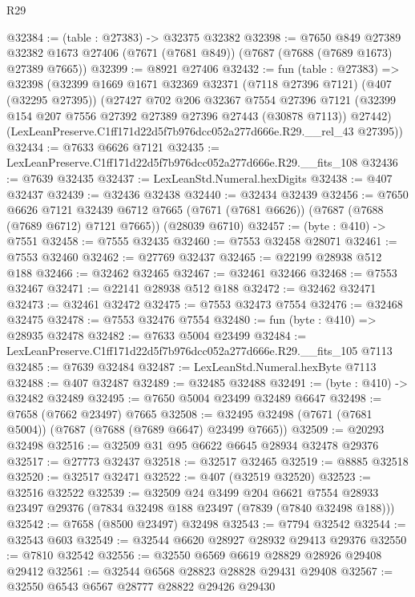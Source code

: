 \begin{lexlean}{R29}
\begin{coremodule}
@32384 := (table : @27383) -> @32375 @32382
@32398 := @7650
    @849
    @27389
    @32382
    @1673
    @27406
    (@7671 (@7681 @849))
    (@7687 (@7688 (@7689 @1673) @27389 @7665))
@32399 := @8921 @27406
@32432 := fun (table : @27383) =>
  @32398
    (@32399
      @1669
      @1671
      @32369
      @32371
      (@7118 @27396 @7121)
      (@407 (@32295 @27395))
      (@27427
        @702
        @206
        @32367
        @7554
        @27396
        @7121
        (@32399 @154 @207 @7556 @27392 @27389 @27396 @27443 (@30878 @7113))
        @27442)
      (LexLeanPreserve.C1ff171d22d5f7b976dcc052a277d666e.R29.__rel_43 @27395))
@32434 := @7633 @6626 @7121
@32435 := LexLeanPreserve.C1ff171d22d5f7b976dcc052a277d666e.R29.__fits_108
@32436 := @7639 @32435
@32437 := LexLeanStd.Numeral.hexDigits
@32438 := @407 @32437
@32439 := @32436 @32438
@32440 := @32434 @32439
@32456 := @7650
    @6626
    @7121
    @32439
    @6712
    @7665
    (@7671 (@7681 @6626))
    (@7687 (@7688 (@7689 @6712) @7121 @7665))
    (@28039 @6710)
@32457 := (byte : @410) -> @7551
@32458 := @7555 @32435
@32460 := @7553 @32458 @28071
@32461 := @7553 @32460
@32462 := @27769 @32437
@32465 := @22199 @28938 @512 @188
@32466 := @32462 @32465
@32467 := @32461 @32466
@32468 := @7553 @32467
@32471 := @22141 @28938 @512 @188
@32472 := @32462 @32471
@32473 := @32461 @32472
@32475 := @7553 @32473 @7554
@32476 := @32468 @32475
@32478 := @7553 @32476 @7554
@32480 := fun (byte : @410) => @28935 @32478
@32482 := @7633 @5004 @23499
@32484 := LexLeanPreserve.C1ff171d22d5f7b976dcc052a277d666e.R29.__fits_105 @7113
@32485 := @7639 @32484
@32487 := LexLeanStd.Numeral.hexByte @7113
@32488 := @407 @32487
@32489 := @32485 @32488
@32491 := (byte : @410) -> @32482 @32489
@32495 := @7650 @5004 @23499 @32489 @6647
@32498 := @7658 (@7662 @23497) @7665
@32508 := @32495 @32498 (@7671 (@7681 @5004)) (@7687 (@7688 (@7689 @6647) @23499 @7665))
@32509 := @20293 @32498
@32516 := @32509 @31 @95 @6622 @6645 @28934 @32478 @29376
@32517 := @27773 @32437
@32518 := @32517 @32465
@32519 := @8885 @32518
@32520 := @32517 @32471
@32522 := @407 (@32519 @32520)
@32523 := @32516 @32522
@32539 := @32509
    @24
    @3499
    @204
    @6621
    @7554
    @28933
    @23497
    @29376
    (@7834 @32498 @188 @23497 (@7839 (@7840 @32498 @188)))
@32542 := @7658 (@8500 @23497) @32498
@32543 := @7794 @32542
@32544 := @32543 @603
@32549 := @32544 @6620 @28927 @28932 @29413 @29376
@32550 := @7810 @32542
@32556 := @32550 @6569 @6619 @28829 @28926 @29408 @29412
@32561 := @32544 @6568 @28823 @28828 @29431 @29408
@32567 := @32550 @6543 @6567 @28777 @28822 @29426 @29430

\end{coremodule}
\end{lexlean}
